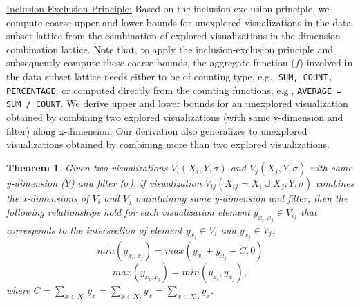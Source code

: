 \underline{Inclusion-Exclusion Principle:} Based on the inclusion-exclusion principle, we compute coarse upper and lower bounds for unexplored visualizations in the data subset lattice from the combination of explored visualizations in the dimension combination lattice. Note that, to apply the inclusion-exclusion principle and subsequently compute these coarse bounds, the aggregate function ($f$) involved in the data subset lattice needs either to be of counting type, e.g., {\tt SUM, COUNT, PERCENTAGE}, or computed directly from the counting functions, e.g., {\tt AVERAGE = SUM / COUNT}. We derive upper and lower bounds for an unexplored visualization obtained by combining two explored visualizations (with same y-dimension and filter) along x-dimension. Our derivation also generalizes to unexplored visualizations obtained by combining more than two explored visualizations.
\newtheorem{theorem}{Theorem}
\begin{theorem}
Given two visualizations $V_i (X_i, Y, \sigma)$ and $V_j (X_j, Y, \sigma)$ with same y-dimension ($Y$) and filter ($\sigma$), if visualization $V_{ij} (X_{ij} = X_i \cup X_j, Y, \sigma)$ combines the x-dimensions of $V_i$ and $V_j$  maintaining same y-dimension and filter, then the following relationships hold for each visualization element $y_{x_i,x_j} {\in} V_{ij}$ that corresponds to the intersection of element $y_{x_{i}}{\in}V_{i}$ and $y_{x_{j}} {\in} V_{j}$: $$min(y_{x_i,x_j}) = max(y_{x_{i}} + y_{x_{j}} - C, 0)$$ $$max(y_{x_i,x_j}) = min(y_{x_{i}}, y_{x_{j}}),$$ where $C = \sum_{x \in X_i} y_x = \sum_{x \in X_j} y_x = \sum_{x \in X_{ij}} y_x$.
\end{theorem}


